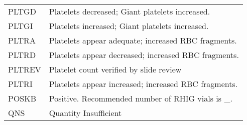\begin{fullwidth}
\begin{longtable}{p{.20\linewidth} p{.75\linewidth}}
PLTGD       & Platelets decreased; Giant platelets increased.                                                                                                                                                                                                                                              \\
PLTGI       & Platelets increased; Giant platelets increased.                                                                                                                                                                                                                                              \\
PLTRA       & Platelets appear adequate; increased RBC fragments.                                                                                                                                                                                                                                          \\
PLTRD       & Platelets appear decreased; increased RBC fragments.                                                                                                                                                                                                                                         \\
PLTREV      & Platelet count verified by slide review                                                                                                                                                                                                                                                      \\
PLTRI       & Platelets appear increased; increased RBC fragments.                                                                                                                                                                                                                                         \\
POSKB       & Positive. Recommended number of RHIG vials is \_.                                                                                                                                                                                                                                             \\
QNS         & Quantity Insufficient                                                                                                                                                                                                                                                                        \\

\end{longtable}
\end{fullwidth}
